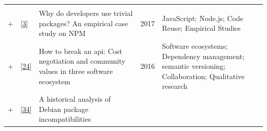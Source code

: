 \documentclass[]{book}
\begin{document}
\begin{longtable}[]{@{}lllll@{}}
\begin{minipage}[t]{0.39\columnwidth}
\strut
\end{minipage}\tabularnewline
\begin{minipage}[t]{0.01\columnwidth}\raggedright\strut
+\strut
\end{minipage} & \begin{minipage}[t]{0.09\columnwidth}\raggedright\strut
{[}\protect\hyperlink{ref-Abdalkareem2017}{3}{]}\strut
\end{minipage} & \begin{minipage}[t]{0.34\columnwidth}\raggedright\strut
Why do developers use trivial packages? An empirical case study on
NPM\strut
\end{minipage} & \begin{minipage}[t]{0.02\columnwidth}\raggedright\strut
2017\strut
\end{minipage} & \begin{minipage}[t]{0.39\columnwidth}\raggedright\strut
JavaScript; Node.js; Code Reuse; Empirical Studies\strut
\end{minipage}\tabularnewline
\begin{minipage}[t]{0.01\columnwidth}\raggedright\strut
+\strut
\end{minipage} & \begin{minipage}[t]{0.09\columnwidth}\raggedright\strut
{[}\protect\hyperlink{ref-Bogart2016}{24}{]}\strut
\end{minipage} & \begin{minipage}[t]{0.34\columnwidth}\raggedright\strut
How to break an api: Cost negotiation and community values in three
software ecosystem\strut
\end{minipage} & \begin{minipage}[t]{0.02\columnwidth}\raggedright\strut
2016\strut
\end{minipage} & \begin{minipage}[t]{0.39\columnwidth}\raggedright\strut
Software ecosystems; Dependency management; semantic versioning;
Collaboration; Qualitative research\strut
\end{minipage}\tabularnewline
\begin{minipage}[t]{0.01\columnwidth}\raggedright\strut
+\strut
\end{minipage} & \begin{minipage}[t]{0.09\columnwidth}\raggedright\strut
{[}\protect\hyperlink{ref-Claes2015}{34}{]}\strut
\end{minipage} & \begin{minipage}[t]{0.34\columnwidth}\raggedright\strut
A historical analysis of Debian package incompatibilities\strut

\end{minipage}
\end{longtable}
\end{document}
